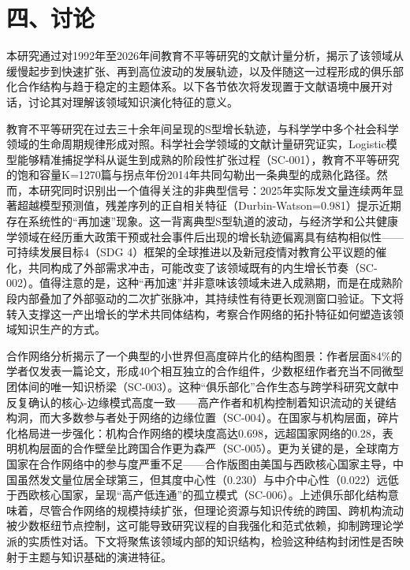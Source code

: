 \documentclass[12pt,a4paper]{article}
\begin{document}
\section{四、讨论}

本研究通过对1992年至2026年间教育不平等研究的文献计量分析，揭示了该领域从缓慢起步到快速扩张、再到高位波动的发展轨迹，以及伴随这一过程形成的俱乐部化合作结构与趋于稳定的主题体系。以下各节依次将发现置于文献语境中展开对话，讨论其对理解该领域知识演化特征的意义。

教育不平等研究在过去三十余年间呈现的S型增长轨迹，与科学学中多个社会科学领域的生命周期规律形成对照。科学社会学领域的文献计量研究证实，Logistic模型能够精准捕捉学科从诞生到成熟的阶段性扩张过程（SC-001），教育不平等研究的饱和容量K=1270篇与拐点年份2014年共同勾勒出一条典型的成熟化路径。然而，本研究同时识别出一个值得关注的非典型信号：2025年实际发文量连续两年显著超越模型预测值，残差序列的正自相关特征（Durbin-Watson=0.981）提示近期存在系统性的“再加速”现象。这一背离典型S型轨道的波动，与经济学和公共健康学领域在经历重大政策干预或社会事件后出现的增长轨迹偏离具有结构相似性——可持续发展目标4（SDG 4）框架的全球推进以及新冠疫情对教育公平议题的催化，共同构成了外部需求冲击，可能改变了该领域既有的内生增长节奏（SC-002）。值得注意的是，这种“再加速”并非意味该领域未进入成熟期，而是在成熟阶段内部叠加了外部驱动的二次扩张脉冲，其持续性有待更长观测窗口验证。下文将转入支撑这一产出增长的学术共同体结构，考察合作网络的拓扑特征如何塑造该领域知识生产的方式。

合作网络分析揭示了一个典型的小世界但高度碎片化的结构图景：作者层面84\%的学者仅发表一篇论文，形成40个相互独立的合作组件，少数枢纽作者充当不同微型团体间的唯一知识桥梁（SC-003）。这种“俱乐部化”合作生态与跨学科研究文献中反复确认的核心-边缘模式高度一致——高产作者和机构控制着知识流动的关键结构洞，而大多数参与者处于网络的边缘位置（SC-004）。在国家与机构层面，碎片化格局进一步强化：机构合作网络的模块度高达0.698，远超国家网络的0.28，表明机构层面的合作壁垒比跨国合作更为森严（SC-005）。更为关键的是，全球南方国家在合作网络中的参与度严重不足——合作版图由美国与西欧核心国家主导，中国虽然发文量位居全球第三，但其度中心性（0.230）与中介中心性（0.022）远低于西欧核心国家，呈现“高产低连通”的孤立模式（SC-006）。上述俱乐部化结构意味着，尽管合作网络的规模持续扩张，但理论资源与知识传统的跨国、跨机构流动被少数枢纽节点控制，这可能导致研究议程的自我强化和范式依赖，抑制跨理论学派的实质性对话。下文将聚焦该领域内部的知识结构，检验这种结构封闭性是否映射于主题与知识基础的演进特征。
\end{document}
